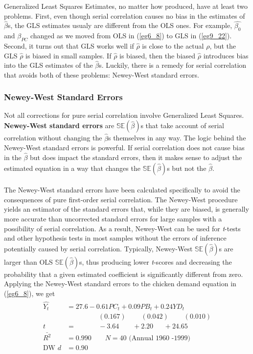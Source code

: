 \documentclass[11pt]{article}
\begin{document}
Generalized Least Squares Estimates, no matter how produced, have at least two problems. First, even though serial correlation causes no bias in the estimates of $\hat{\beta}$s, the GLS estimates usualy are different from the OLS ones. For example, $\hat{\beta_0}$ and $\beta_{PC}$ changed as we moved from OLS in (\ref{eg6_8}) to GLS in (\ref{eg9_22}). Second, it turns out that GLS works well if $\hat{\rho}$ is close to the actual $\rho$, but the GLS $\hat{\rho}$ is biased in small samples. If $\hat{\rho}$ is biased, then the biased $\hat{\rho}$ introduces bias into the GLS estimates of the $\hat{\beta}$s. Luckily, there is a remedy for serial correlation that avoids both of these problems: Newey-West standard errors.
\subsubsection{Newey-West Standard Errors}
Not all corrections for pure serial correlation involve Generalized Least Squares. \textbf{Newey-West standard errors} are $\mathbb{SE}(\hat{\beta})$s that take account of serial correlation without changing the $\hat{\beta}$s themselves in any way. The logic behind the Newey-West standard errors is powerful. If serial correlation does not cause bias in the $\hat{\beta}$ but does impact the standard errors, then it makes sense to adjust the estimated equation in a way that changes the $\mathbb{SE} (\hat{\beta})$s but not the $\hat{\beta}$.\\ \\
The Newey-West standard errors have been calculated specifically to avoid the consequences of pure first-order serial correlation. The Newey-West procedure yields an estimator of the standard errors that, while they are biased, is generally more accurate than uncorrected standard errors for large samples with a possibility of serial correlation. As a result, Newey-West can be used for \textit{t}-tests and other hypothesis tests in most samples without the errors of inference potentially caused by serial correlation. Typically, Newey-West $\mathbb{SE} (\hat{\beta})$s are larger than OLS $\mathbb{SE} (\hat{\beta})$s, thus producing lower \textit{t}-scores and decreasing the probability that a given estimated coefficient is significantly different from zero. Applying the Newey-West standard errors to the chicken demand equation in (\ref{eg6_8}), we get
\begin{align}
\label{eg9_23}
\begin{split}
\hat{Y_t} &= 27.6 - {0.61PC_t} + {0.09PB_t} + {0.24YD_t}\\
&\>\>\>\>\>\>\>\>\>\>\>\>\>\>\>\>\>\>\>\>\> (0.167) 
\>\>\>\>\>\>\>\>\>\> (0.042)
\>\>\>\>\>\>\>\>\>\> (0.010)\\
t&=\>\>\>\>\>\>\>\>\>\>\>\>\>\>\> -3.64
\>\>\>\>\>\>\>\>\> +2.20
\>\>\>\>\>\>\> +24.65\\
\bar{R^2}&= 0.990 \quad\quad N=40 \text{  (Annual 1960 -1999)}
\\ \text{DW }d&= 0.90
\end{split}
\end{align}
\end{document}
